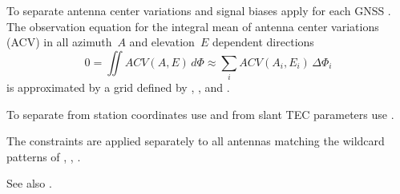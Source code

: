To separate antenna center variations and signal biases
apply  for each GNSS .
The observation equation for the integral mean of antenna center variations (ACV)
in all azimuth~$A$ and elevation~$E$ dependent directions
\begin{equation}
  0 = \iint ACV(A,E)\, d\Phi \approx \sum_i ACV(A_i,E_i)\, \Delta\Phi_i
\end{equation}
is approximated by a grid defined by
, , and .

To separate from station coordinates use 
and from slant TEC parameters use .

The constraints are applied separately to all antennas matching
the wildcard patterns of , , .

See also .


